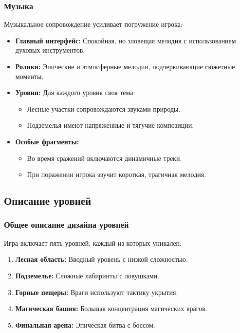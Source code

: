 \documentclass{article}
\begin{document}
\subsubsection{Музыка}
Музыкальное сопровождение усиливает погружение игрока:
\begin{itemize}
    \item \textbf{Главный интерфейс:} Спокойная, но зловещая мелодия с использованием духовых инструментов.
    \item \textbf{Ролики:} Эпические и атмосферные мелодии, подчеркивающие сюжетные моменты.
    \item \textbf{Уровни:} Для каждого уровня своя тема:
    \begin{itemize}
        \item Лесные участки сопровождаются звуками природы.
        \item Подземелья имеют напряженные и тягучие композиции.
    \end{itemize}
    \item \textbf{Особые фрагменты:}
    \begin{itemize}
        \item Во время сражений включаются динамичные треки.
        \item При поражении игрока звучит короткая, трагичная мелодия.
    \end{itemize}
\end{itemize}

\subsection{Описание уровней}
\subsubsection{Общее описание дизайна уровней}
Игра включает пять уровней, каждый из которых уникален:
\begin{enumerate}
    \item \textbf{Лесная область:} Вводный уровень с низкой сложностью.
    \item \textbf{Подземелье:} Сложные лабиринты с ловушками.
    \item \textbf{Горные пещеры:} Враги используют тактику укрытия.
    \item \textbf{Магическая башня:} Большая концентрация магических врагов.
    \item \textbf{Финальная арена:} Эпическая битва с боссом.
\end{enumerate}
\end{document}
